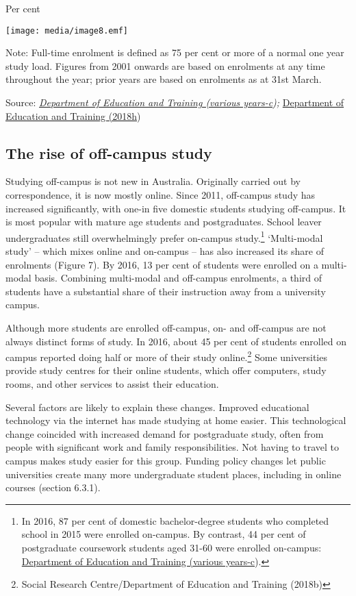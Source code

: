 \documentclass[]{book}
\begin{document}
Per cent

\texttt{[image: media/image8.emf]}

Note: Full-time enrolment is defined as 75 per cent or more of a normal one year study load. Figures from 2001 onwards are based on enrolments at any time throughout the year; prior years are based on enrolments as at 31st March.

Source: \emph{\protect\hyperlink{_ENREF_114}{Department of Education and Training (various years-c});} \protect\hyperlink{_ENREF_87}{Department of Education and Training (2018h})

\hypertarget{the-rise-of-off-campus-study}{%
\subsection{The rise of off-campus study}\label{the-rise-of-off-campus-study}}

Studying off-campus is not new in Australia. Originally carried out by correspondence, it is now mostly online. Since 2011, off-campus study has increased significantly, with one-in five domestic students studying off-campus. It is most popular with mature age students and postgraduates. School leaver undergraduates still overwhelmingly prefer on-campus study.\footnote{In 2016, 87 per cent of domestic bachelor-degree students who completed school in 2015 were enrolled on-campus. By contrast, 44 per cent of postgraduate coursework students aged 31-60 were enrolled on-campus: \protect\hyperlink{_ENREF_114}{Department of Education and Training (various years-c}).} `Multi-modal study' -- which mixes online and on-campus -- has also increased its share of enrolments (Figure 7). By 2016, 13 per cent of students were enrolled on a multi-modal basis. Combining multi-modal and off-campus enrolments, a third of students have a substantial share of their instruction away from a university campus.

Although more students are enrolled off-campus, on- and off-campus are not always distinct forms of study. In 2016, about 45 per cent of students enrolled on campus reported doing half or more of their study online.\footnote{Social Research Centre/Department of Education and Training (2018b)} Some universities provide study centres for their online students, which offer computers, study rooms, and other services to assist their education.

Several factors are likely to explain these changes. Improved educational technology via the internet has made studying at home easier. This technological change coincided with increased demand for postgraduate study, often from people with significant work and family responsibilities. Not having to travel to campus makes study easier for this group. Funding policy changes let public universities create many more undergraduate student places, including in online courses (section 6.3.1).
\end{document}
